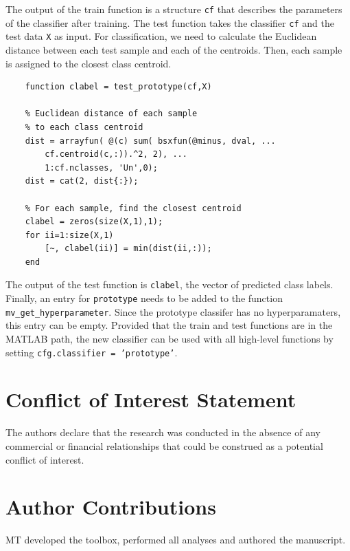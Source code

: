 \documentclass[utf8]{frontiersSCNS} %
\newcommand{\ttt}[1]{\texttt{#1}}
\begin{document}
The output of the train function is a structure \ttt{cf} that describes the parameters of the classifier after training. The test function takes the classifier \ttt{cf} and the test data \ttt{X} as input. For classification, we need to calculate the Euclidean distance between each test sample and each of the centroids. Then, each sample is assigned to the closest class centroid.

\begin{verbatim}
    function clabel = test_prototype(cf,X)

    % Euclidean distance of each sample 
    % to each class centroid
    dist = arrayfun( @(c) sum( bsxfun(@minus, dval, ...
        cf.centroid(c,:)).^2, 2), ...
        1:cf.nclasses, 'Un',0);
    dist = cat(2, dist{:});

    % For each sample, find the closest centroid
    clabel = zeros(size(X,1),1);
    for ii=1:size(X,1)
        [~, clabel(ii)] = min(dist(ii,:));
    end

\end{verbatim}

The output of the test function is \ttt{clabel}, the vector of predicted class labels. Finally, an entry for \ttt{prototype} needs to be added to the function \ttt{mv\_get\_hyperparameter}. Since the prototype classifer has no hyperparamaters, this entry can be empty. Provided that the train and test functions are in the MATLAB path, the new classifier can be used with all high-level functions by setting \ttt{cfg.classifier = 'prototype'}.


\section*{Conflict of Interest Statement}

The authors declare that the research was conducted in the absence of any commercial or financial relationships that could be construed as a potential conflict of interest.

\section*{Author Contributions}

MT developed the toolbox, performed all analyses and authored the manuscript.
\end{document}
